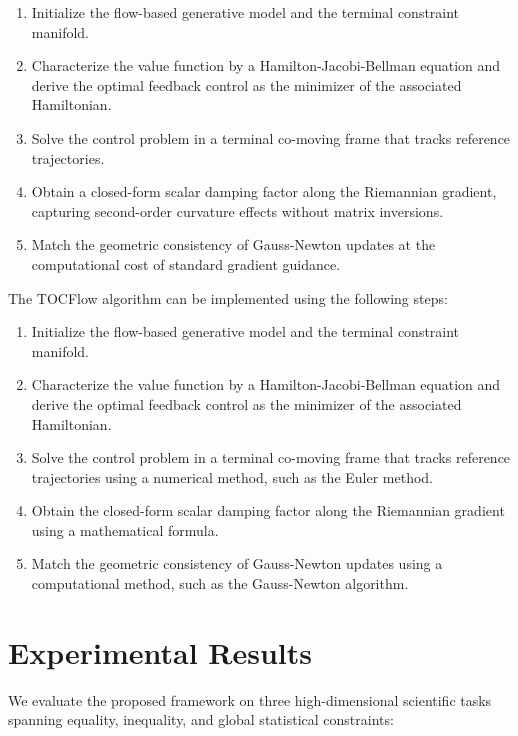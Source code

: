 \documentclass{article}
\begin{document}
        \begin{enumerate}
        \item Initialize the flow-based generative model and the terminal constraint manifold.
        \item Characterize the value function by a Hamilton-Jacobi-Bellman equation and derive the optimal feedback control as the minimizer of the associated Hamiltonian.
        \item Solve the control problem in a terminal co-moving frame that tracks reference trajectories.
        \item Obtain a closed-form scalar damping factor along the Riemannian gradient, capturing second-order curvature effects without matrix inversions.
        \item Match the geometric consistency of Gauss-Newton updates at the computational cost of standard gradient guidance.
        \end{enumerate}

        The TOCFlow algorithm can be implemented using the following steps:

        \begin{enumerate}
        \item Initialize the flow-based generative model and the terminal constraint manifold.
        \item Characterize the value function by a Hamilton-Jacobi-Bellman equation and derive the optimal feedback control as the minimizer of the associated Hamiltonian.
        \item Solve the control problem in a terminal co-moving frame that tracks reference trajectories using a numerical method, such as the Euler method.
        \item Obtain the closed-form scalar damping factor along the Riemannian gradient using a mathematical formula.
        \item Match the geometric consistency of Gauss-Newton updates using a computational method, such as the Gauss-Newton algorithm.
        \end{enumerate}

        \section{Experimental Results}

        We evaluate the proposed framework on three high-dimensional scientific tasks spanning equality, inequality, and global statistical constraints:
\end{document}
